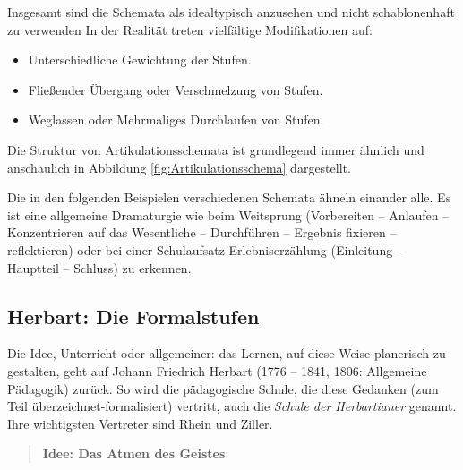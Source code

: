 \mip
Insgesamt sind die Schemata als idealtypisch anzusehen und
nicht schablonenhaft zu verwenden
In der Realit\"{a}t treten vielf\"{a}ltige Modifikationen auf:
\begin{itemize}
	\item
	Unterschiedliche Gewichtung der Stufen.
	\item
	Flie{\ss}ender \"{U}bergang oder Verschmelzung von Stufen.
	\item
	Weglassen oder Mehrmaliges Durchlaufen von Stufen.
\end{itemize}


Die Struktur von Artikulationsschemata ist grundlegend immer \"{a}hnlich und anschaulich in Abbildung \ref{fig:Artikulationsschema} dargestellt.

\mip
Die in den folgenden Beispielen verschiedenen Schemata \"{a}hneln
einander alle. Es ist eine allgemeine Dramaturgie
wie beim Weitsprung (Vorbereiten -- Anlaufen -- Konzentrieren
auf das Wesentliche -- Durchf\"{u}hren -- Ergebnis fixieren --
reflektieren) oder bei einer
Schulaufsatz-Erlebniserz\"{a}hlung (Einleitung -- Hauptteil -- Schluss) zu erkennen.

\subsection{Herbart: Die Formalstufen}
Die Idee, Unterricht oder allgemeiner: das Lernen, auf diese
Weise planerisch zu gestalten, geht auf Johann Friedrich
Herbart (1776 -- 1841, 1806: Allgemeine P\"{a}dagogik) zur\"{u}ck.
So wird die p\"{a}dagogische Schule, die diese Gedanken (zum Teil
\"{u}berzeichnet-formalisiert) vertritt,
auch die {\em Schule der Herbartianer} genannt.
Ihre wichtigsten Vertreter sind Rhein und Ziller.

\begin{quote}
	\bf Idee: Das Atmen des Geistes
\end{quote}

